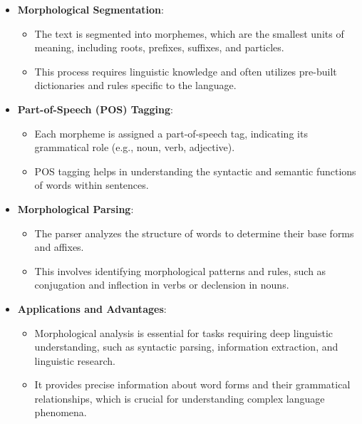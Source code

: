 \documentclass{article}
\begin{document}
\begin{itemize}
\item \textbf{Morphological Segmentation}:
    \begin{itemize}
        \item The text is segmented into morphemes, which are the smallest units of meaning, including roots, prefixes, suffixes, and particles.
        \item This process requires linguistic knowledge and often utilizes pre-built dictionaries and rules specific to the language.
    \end{itemize}
\item \textbf{Part-of-Speech (POS) Tagging}:
    \begin{itemize}
        \item Each morpheme is assigned a part-of-speech tag, indicating its grammatical role (e.g., noun, verb, adjective).
        \item POS tagging helps in understanding the syntactic and semantic functions of words within sentences.
   \end{itemize}
\item \textbf{Morphological Parsing}:
    \begin{itemize}
        \item The parser analyzes the structure of words to determine their base forms and affixes.
        \item This involves identifying morphological patterns and rules, such as conjugation and inflection in verbs or declension in nouns.
    \end{itemize}
\item \textbf{Applications and Advantages}:
    \begin{itemize}
        \item Morphological analysis is essential for tasks requiring deep linguistic understanding, such as syntactic parsing, information extraction, and linguistic research.
        \item It provides precise information about word forms and their grammatical relationships, which is crucial for understanding complex language phenomena.
    \end{itemize}
\end{itemize}
\end{document}

